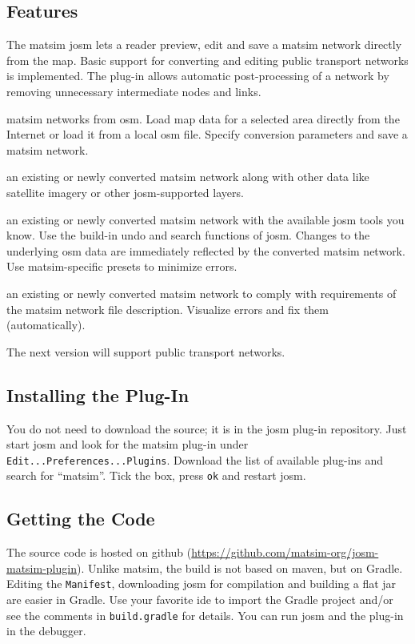 \subsection{Features}
The \gls{matsim} \gls{josm} lets a reader preview, edit and save a \gls{matsim} network directly from the map. Basic support for converting and editing public transport networks is implemented. The plug-in allows automatic post-processing of a network by removing unnecessary intermediate nodes and links.
\begin{description}\styleDescription
\item[Convert] \gls{matsim} networks from \gls{osm}. Load map data for a selected area directly from the Internet or load it from a local \gls{osm} file. Specify conversion parameters and save a \gls{matsim} network.
\item[Visualize] an existing or newly converted \gls{matsim} network along with other data like satellite imagery or other \gls{josm}-supported layers.
\item[Edit] an existing or newly converted \gls{matsim} network with the available \gls{josm} tools you know. Use the build-in undo and search functions of \gls{josm}. Changes to the underlying \gls{osm} data are immediately reflected by the converted \gls{matsim} network. Use \gls{matsim}-specific presets to minimize errors.
\item[Validate] an existing or newly converted \gls{matsim} network to comply with requirements of the \gls{matsim} network file description. Visualize errors and fix them (automatically). 
\end{description}
The next version will support public transport networks.

\subsection{Installing the Plug-In}
You do not need to download the source; it is in the \gls{josm} plug-in repository. Just start \gls{josm} and look for the \gls{matsim} plug-in under \lstinline|Edit...Preferences...Plugins|. Download the list of available plug-ins and search for ``matsim''. Tick the box, press \lstinline|ok| and restart \gls{josm}.

\subsection{Getting the Code}
The source code is hosted on github (\url{https://github.com/matsim-org/josm-matsim-plugin}). Unlike \gls{matsim}, the build is not based on \gls{maven}, but on Gradle. Editing the \lstinline|Manifest|, downloading \gls{josm} for compilation and building a flat \gls{jar} are easier in Gradle. Use your favorite \gls{ide} to import the Gradle project and/or see the comments in \lstinline|build.gradle| for details. You can run \gls{josm} and the plug-in in the debugger.
 
